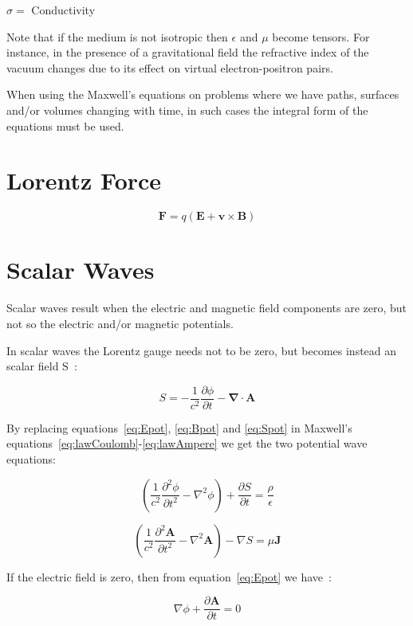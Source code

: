 \documentclass[english]{book}
\begin{document}
$\sigma =$ Conductivity

Note that if the medium is not isotropic then $\epsilon$ and $\mu$ become tensors. For instance, in the presence of a gravitational field the refractive index of the vacuum changes due to its effect on virtual electron-positron pairs.

When using the Maxwell's equations on problems where we have paths, surfaces and/or volumes changing with time, in such cases the integral form of the equations must be used.


\section{Lorentz Force}

\[
\mathbf{F}=q\left(\mathbf{E}+\mathbf{v}\times\mathbf{B}\right)
\]


\section{Scalar Waves}

Scalar waves result when the electric and magnetic field components are zero, but not so the electric and/or magnetic potentials.

In scalar waves the Lorentz gauge needs not to be zero, but becomes instead an scalar field S~\cite{Vlaen}:

\begin{equation}
S = -\frac{1}{c^{2}}\frac{\partial\phi}{\partial t} - \mathbf{\nabla} \cdot \mathbf{A}      \label{eq:Spot}
\end{equation}

By replacing equations~\ref{eq:Epot}, \ref{eq:Bpot} and \ref{eq:Spot} in Maxwell's equations~\ref{eq:lawCoulomb}-\ref{eq:lawAmpere} we get the two potential wave equations:

\[
\left( \frac{1}{c^{2}}\frac{\partial^{2}\phi}{\partial t^{2}} - \nabla^{2}\phi \right) + \frac{\partial S}{\partial t} = \frac{\rho}{\epsilon}
\]

\[
\left( \frac{1}{c^{2}}\frac{\partial^{2}\mathbf{A}}{\partial t^{2}} - \nabla^{2}\mathbf{A} \right) - \nabla S = \mu \mathbf{J}
\]

If the electric field is zero, then from equation~\ref{eq:Epot} we have~\cite{Dea}:

\begin{equation}
\nabla\phi + \frac{\partial\mathbf{A}}{\partial t} = 0      \label{eq:xi}
\end{equation}
\end{document}
